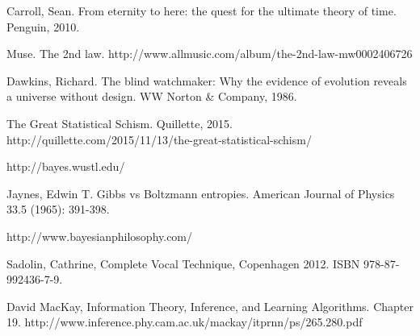 \documentclass[a4paper, 12pt]{article}
\begin{document}
\begin{thebibliography}{999} %
Carroll, Sean. From eternity to here: the quest for the ultimate theory of time. Penguin, 2010.

Muse. The 2nd law.
http://www.allmusic.com/album/the-2nd-law-mw0002406726

Dawkins, Richard. The blind watchmaker: Why the evidence of evolution reveals a universe without design. WW Norton \& Company, 1986.

 The Great Statistical Schism. Quillette, 2015.
http://quillette.com/2015/11/13/the-great-statistical-schism/

http://bayes.wustl.edu/

Jaynes, Edwin T.
Gibbs vs Boltzmann entropies. American Journal of Physics 33.5 (1965): 391-398.

http://www.bayesianphilosophy.com/

Sadolin, Cathrine, Complete Vocal Technique, Copenhagen 2012.
ISBN 978-87-992436-7-9.

David MacKay, Information Theory, Inference, and Learning Algorithms.
Chapter 19.
http://www.inference.phy.cam.ac.uk/mackay/itprnn/ps/265.280.pdf

\end{thebibliography}
\end{document}
